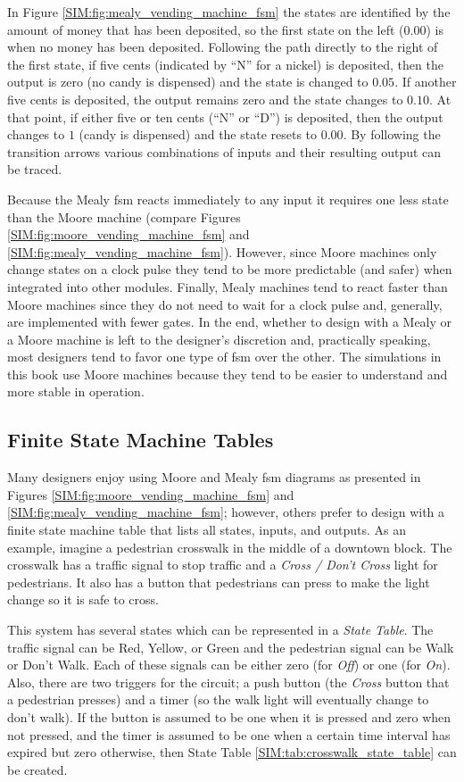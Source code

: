 In Figure \ref{SIM:fig:mealy_vending_machine_fsm} the states are identified by the amount of money that has been deposited, so the first state on the left ($ 0.00 $) is when no money has been deposited. Following the path directly to the right of the first state, if five cents (indicated by ``N'' for a nickel) is deposited, then the output is zero (no candy is dispensed) and the state is changed to $ 0.05 $. If another five cents is deposited, the output remains zero and the state changes to $ 0.10 $. At that point, if either five or ten cents (``N'' or ``D'') is deposited, then the output changes to $ 1 $ (candy is dispensed) and the state resets to $ 0.00 $. By following the transition arrows various combinations of inputs and their resulting output can be traced.

Because the Mealy \gls{fsm} reacts immediately to any input it requires one less state than the Moore machine (compare Figures \ref{SIM:fig:moore_vending_machine_fsm} and \ref{SIM:fig:mealy_vending_machine_fsm}). However, since Moore machines only change states on a clock pulse they tend to be more predictable (and safer) when integrated into other modules. Finally, Mealy machines tend to react faster than Moore machines since they do not need to wait for a clock pulse and, generally, are implemented with fewer gates. In the end, whether to design with a Mealy or a Moore machine is left to the designer's discretion and, practically speaking, most designers tend to favor one type of \gls{fsm} over the other. The simulations in this book use Moore machines because they tend to be easier to understand and more stable in operation.

\subsection{Finite State Machine Tables}
\label{SIM:subsec:finite_state_machine_tables}

Many designers enjoy using Moore and Mealy \gls{fsm} diagrams as presented in Figures \ref{SIM:fig:moore_vending_machine_fsm} and \ref{SIM:fig:mealy_vending_machine_fsm}; however, others prefer to design with a finite state machine table that lists all states, inputs, and outputs. As an example, imagine a pedestrian crosswalk in the middle of a downtown block. The crosswalk has a traffic signal to stop traffic and a \emph{Cross / Don't Cross} light for pedestrians. It also has a button that pedestrians can press to make the light change so it is safe to cross.

This system has several states which can be represented in a \emph{State Table}. The traffic signal can be Red, Yellow, or Green and the pedestrian signal can be Walk or Don't Walk. Each of these signals can be either zero (for \emph{Off}) or one (for \emph{On}). Also, there are two triggers for the circuit; a push button (the \emph{Cross} button that a pedestrian presses) and a timer (so the walk light will eventually change to don't walk). If the button is assumed to be one when it is pressed and zero when not pressed, and the timer is assumed to be one when a certain time interval has expired but zero otherwise, then State Table \ref{SIM:tab:crosswalk_state_table} can be created.

